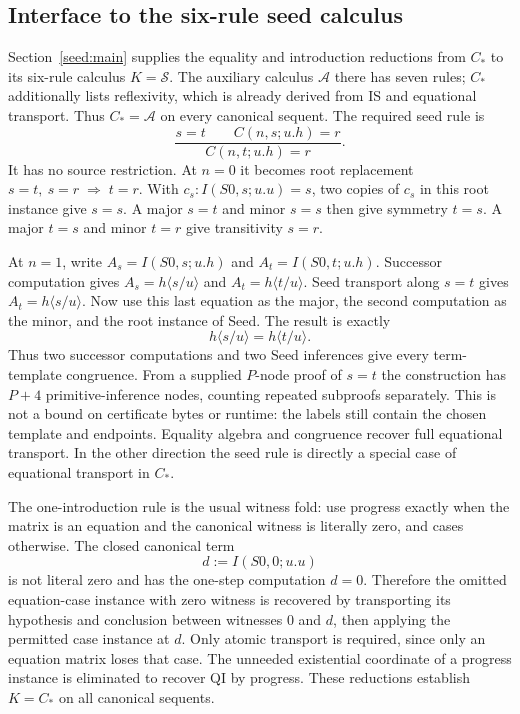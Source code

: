 \documentclass[11pt,a4paper]{article}
\theoremstyle{definition}
\begin{document}
\subsection{Interface to the six-rule seed calculus}

Section~\ref{seed:main} supplies the equality and introduction reductions
from $C_*$ to its six-rule calculus $K=\mathcal S$. The auxiliary calculus
$\mathcal A$ there has seven rules; $C_*$ additionally lists reflexivity,
which is already derived from IS and equational transport. Thus
$C_*=\mathcal A$ on every canonical sequent.  The required seed rule is
\[
 \frac{s=t\qquad C(n,s;u.h)=r}{C(n,t;u.h)=r}.
\]
It has no source restriction.  At $n=0$ it becomes root replacement
$s=t,\ s=r\;\Longrightarrow\;t=r$.  With
$c_s:I(S0,s;u.u)=s$, two copies of $c_s$ in this root instance give
$s=s$.  A major $s=t$ and minor $s=s$ then give symmetry $t=s$.
A major $t=s$ and minor $t=r$ give transitivity $s=r$.

At $n=1$, write $A_s=I(S0,s;u.h)$ and $A_t=I(S0,t;u.h)$.
Successor computation gives $A_s=h\langle s/u\rangle$ and
$A_t=h\langle t/u\rangle$.  Seed transport along $s=t$ gives
$A_t=h\langle s/u\rangle$.  Now use this last equation as the major,
the second computation as the minor, and the root instance of Seed.
The result is exactly
\[
 h\langle s/u\rangle=h\langle t/u\rangle.
\]
Thus two successor computations and two Seed inferences give every
term-template congruence.  From a supplied $P$-node proof of $s=t$ the
construction has $P+4$ primitive-inference nodes, counting repeated
subproofs separately.  This is not a bound on certificate bytes or
runtime: the labels still contain the chosen template and endpoints.
Equality algebra and congruence recover full equational transport.
In the other direction the seed rule is directly a special case of
equational transport in $C_*$.

The one-introduction rule is the usual witness fold: use progress exactly
when the matrix is an equation and the canonical witness is literally
zero, and cases otherwise.  The closed canonical term
\[
 d:=I(S0,0;u.u)
\]
is not literal zero and has the one-step computation $d=0$.  Therefore
the omitted equation-case instance with zero witness is recovered by
transporting its hypothesis and conclusion between witnesses $0$ and
$d$, then applying the permitted case instance at $d$.  Only atomic
transport is required, since only an equation matrix loses that case.
The unneeded existential coordinate of a progress instance is eliminated
to recover QI by progress.  These reductions establish $K=C_*$ on all
canonical sequents.
\end{document}
